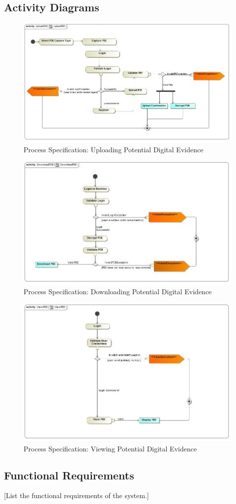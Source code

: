 \documentclass[a4paper,12pt]{article}
\begin{document}
\subsection{Activity Diagrams}
\begin{figure}[H]
\includegraphics[width=\textwidth]{images/UploadPDE.jpg}
\caption{Process Specification: Uploading Potential Digital Evidence \label{overflow}}
\end{figure}

\begin{figure}[H]
\includegraphics[width=\textwidth]{images/DownloadPDE.jpg}
\caption{Process Specification: Downloading Potential Digital Evidence \label{overflow}}
\end{figure}

\begin{figure}[H]
\includegraphics[width=\textwidth]{images/ViewPDE.jpg}
\caption{Process Specification: Viewing Potential Digital Evidence \label{overflow}}
\end{figure}

\subsection{Functional Requirements}
[List the functional requirements of the system.]
\end{document}
